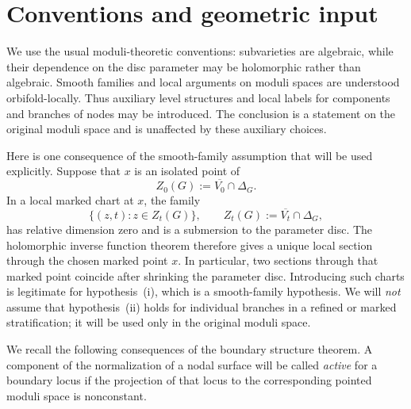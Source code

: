\documentclass[11pt]{article}
\newcommand{\ol}[1]{\overline{#1}}
\theoremstyle{remark}
\begin{document}
\begin{abstract}
We prove the asserted constancy using rigidity of Teichm\"uller curves
and the boundary structure theorem for totally geodesic subvarieties.
An important preliminary observation is that the compatibility
hypothesis forces every positive-dimensional boundary locus in a
stratum with at least two nodes to remain fixed set-theoretically.
This observation also handles the possibility that a cusp of one
boundary curve lies on another positive-dimensional boundary locus.
\end{abstract}

\section{Conventions and geometric input}

We use the usual moduli-theoretic conventions: subvarieties are
algebraic, while their dependence on the disc parameter may be
holomorphic rather than algebraic. Smooth families and local
arguments on moduli spaces are understood orbifold-locally.
Thus auxiliary level structures and local labels for components and
branches of nodes may be introduced. The conclusion is a statement
on the original moduli space and is unaffected by these auxiliary
choices.

Here is one consequence of the smooth-family assumption that will
be used explicitly. Suppose that \(x\) is an isolated point of
\[
Z_0(G):=\ol{V_0}\cap\Delta_G.
\]
In a local marked chart at \(x\), the family
\[
\{(z,t):z\in Z_t(G)\},\qquad
Z_t(G):=\ol{V_t}\cap\Delta_G,
\]
has relative dimension zero and is a submersion to the parameter
disc. The holomorphic inverse function theorem therefore gives
a unique local section through the chosen marked point \(x\).
In particular, two sections through that marked point coincide
after shrinking the parameter disc. Introducing such charts is
legitimate for hypothesis~(i), which is a smooth-family hypothesis.
We will \emph{not} assume that hypothesis~(ii) holds for individual
branches in a refined or marked stratification; it will be used
only in the original moduli space.

We recall the following consequences of the boundary structure
theorem. A component of the normalization of a nodal surface will
be called \emph{active} for a boundary locus if the projection of
that locus to the corresponding pointed moduli space is
nonconstant.
\end{document}
